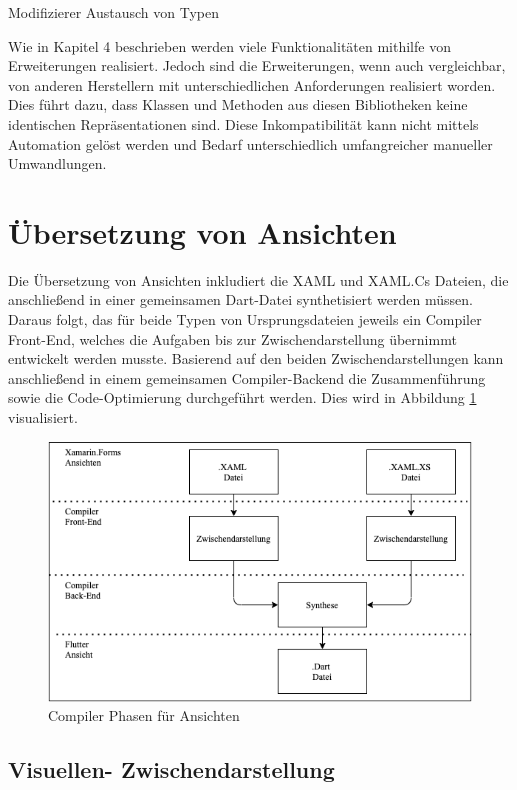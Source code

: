 Modifizierer
Austausch von Typen

Wie in Kapitel 4 beschrieben werden viele Funktionalitäten mithilfe von Erweiterungen realisiert.  Jedoch sind die Erweiterungen, wenn auch vergleichbar, von anderen Herstellern mit unterschiedlichen Anforderungen realisiert worden.  Dies führt dazu,  dass Klassen und Methoden aus diesen Bibliotheken keine identischen Repräsentationen sind.  Diese Inkompatibilität kann nicht mittels Automation gelöst werden und Bedarf  unterschiedlich umfangreicher manueller Umwandlungen.  


\section{Übersetzung von Ansichten}
Die Übersetzung von Ansichten inkludiert die XAML und XAML.Cs Dateien, die anschließend in einer gemeinsamen Dart-Datei synthetisiert werden müssen.  Daraus folgt,  das für beide Typen von Ursprungsdateien jeweils ein Compiler Front-End,  welches die Aufgaben bis zur Zwischendarstellung übernimmt entwickelt werden musste.  Basierend auf den beiden Zwischendarstellungen kann anschließend in einem gemeinsamen Compiler-Backend die Zusammenführung sowie die Code-Optimierung durchgeführt werden.  Dies wird in Abbildung  \ref{fig:ViewCompilerPhases} visualisiert. 

\begin{figure}[!ht]
 \includegraphics[width=\textwidth,keepaspectratio]{Images/Implementation/ViewCompiler.png}
 \caption{Compiler Phasen für Ansichten}
 \label{fig:ViewCompilerPhases}
\end{figure}

\subsection{Visuellen- Zwischendarstellung}

